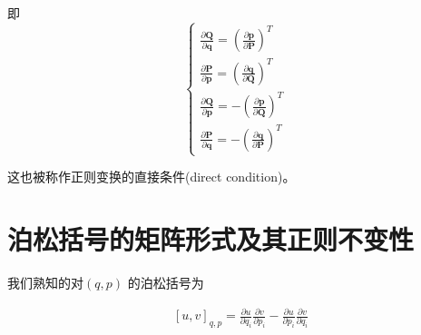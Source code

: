 \documentclass[12pt]{ctexart}
\begin{document}
即
\begin{equation}
    \boxed{\begin{cases}\frac{\partial\boldsymbol{Q}}{\partial\boldsymbol{q}}=\left(\frac{\partial\boldsymbol{p}}{\partial\boldsymbol{P}}\right)^T\\\frac{\partial\boldsymbol{P}}{\partial\boldsymbol{p}}=\left(\frac{\partial\boldsymbol{q}}{\partial\boldsymbol{Q}}\right)^T\\\frac{\partial\boldsymbol{Q}}{\partial\boldsymbol{p}}=-\left(\frac{\partial\boldsymbol{p}}{\partial\boldsymbol{Q}}\right)^T\\\frac{\partial\boldsymbol{P}}{\partial\boldsymbol{q}}=-\left(\frac{\partial\boldsymbol{q}}{\partial\boldsymbol{P}}\right)^T\end{cases}}
    \label{eq:26}
\end{equation}

这也被称作正则变换的直接条件(direct condition)。

\section{泊松括号的矩阵形式及其正则不变性}
我们熟知的对$(q,p)$ 的泊松括号为

\begin{equation}
\begin{aligned}
    &[u,v]_{q,p}=\frac{\partial u}{\partial q_i}\frac{\partial v}{\partial p_i}-\frac{\partial u}{\partial p_i}\frac{\partial v}{\partial q_i} 
\end{aligned}
\end{equation}
    
\end{document}
